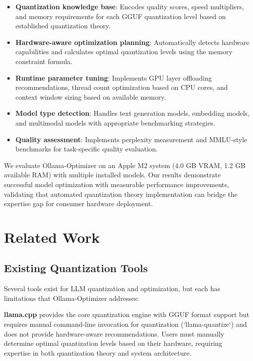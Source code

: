 \documentclass[journal]{IEEEtran}
\begin{document}
\begin{itemize}
    \item \textbf{Quantization knowledge base}: Encodes quality scores, speed multipliers, and memory requirements for each GGUF quantization level based on established quantization theory.
    \item \textbf{Hardware-aware optimization planning}: Automatically detects hardware capabilities and calculates optimal quantization levels using the memory constraint formula.
    \item \textbf{Runtime parameter tuning}: Implements GPU layer offloading recommendations, thread count optimization based on CPU cores, and context window sizing based on available memory.
    \item \textbf{Model type detection}: Handles text generation models, embedding models, and multimodal models with appropriate benchmarking strategies.
    \item \textbf{Quality assessment}: Implements perplexity measurement and MMLU-style benchmarks for task-specific quality evaluation.
\end{itemize}

We evaluate Ollama-Optimizer on an Apple M2 system (4.0 GB VRAM, 1.2 GB available RAM) with multiple installed models. Our results demonstrate successful model optimization with measurable performance improvements, validating that automated quantization theory implementation can bridge the expertise gap for consumer hardware deployment.

\section{Related Work}

\subsection{Existing Quantization Tools}

Several tools exist for LLM quantization and optimization, but each has limitations that Ollama-Optimizer addresses:

\textbf{llama.cpp} \cite{gerganov2023} provides the core quantization engine with GGUF format support but requires manual command-line invocation for quantization (`llama-quantize`) and does not provide hardware-aware recommendations. Users must manually determine optimal quantization levels based on their hardware, requiring expertise in both quantization theory and system architecture.
\end{document}
